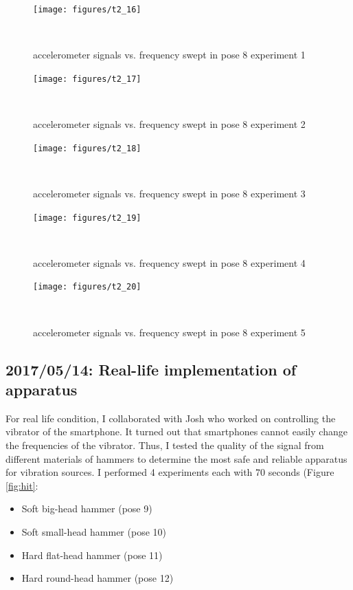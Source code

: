 \documentclass{sigchi}
\begin{document}
\begin{figure}
  \centering
  \texttt{[image: figures/t2\_16]}
  \caption{accelerometer signals vs. frequency swept in pose 8 experiment 1}
    ~\label{fig:t2_16}
\end{figure}

\begin{figure}
  \centering
  \texttt{[image: figures/t2\_17]}
  \caption{accelerometer signals vs. frequency swept in pose 8 experiment 2}
    ~\label{fig:t2_17}
\end{figure}

\begin{figure}
  \centering
  \texttt{[image: figures/t2\_18]}
  \caption{accelerometer signals vs. frequency swept in pose 8 experiment 3}
    ~\label{fig:t2_18}
\end{figure}

\begin{figure}
  \centering
  \texttt{[image: figures/t2\_19]}
  \caption{accelerometer signals vs. frequency swept in pose 8 experiment 4}
    ~\label{fig:t2_19}
\end{figure}

\begin{figure}
  \centering
  \texttt{[image: figures/t2\_20]}
  \caption{accelerometer signals vs. frequency swept in pose 8 experiment 5}
    ~\label{fig:t2_20}
\end{figure}

\subsection{2017/05/14: Real-life implementation of apparatus} 

For real life condition, I collaborated with Josh who worked on controlling the vibrator of the smartphone. It turned out that smartphones cannot easily change the frequencies of the vibrator. Thus, I tested the quality of the signal from different materials of hammers to determine the most safe and reliable apparatus for vibration sources. I performed 4 experiments each with 70 seconds (Figure \ref{fig:hit}: 
\begin{itemize}
\item Soft big-head hammer (pose 9)
\item Soft small-head hammer (pose 10)
\item Hard flat-head hammer (pose 11)
\item Hard round-head hammer (pose 12)
\end{itemize}
\end{document}
